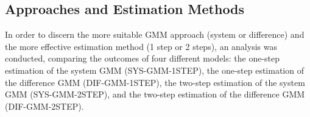 \documentclass[12pt]{article}
\begin{document}
\subsection{Approaches and Estimation Methods}

In order to discern the more suitable GMM approach (system or difference) and the more effective estimation method (1 step or 2 steps), an analysis was conducted, comparing the outcomes of four different models: the one-step estimation of the system GMM (SYS-GMM-1STEP), the one-step estimation of the difference GMM (DIF-GMM-1STEP), the two-step estimation of the system GMM (SYS-GMM-2STEP), and the two-step estimation of the difference GMM (DIF-GMM-2STEP).

\begin{tabular}{ p{5.2cm} p{2cm} p{2cm} p{2cm} p{2cm} }


\end{tabular}
\end{document}
